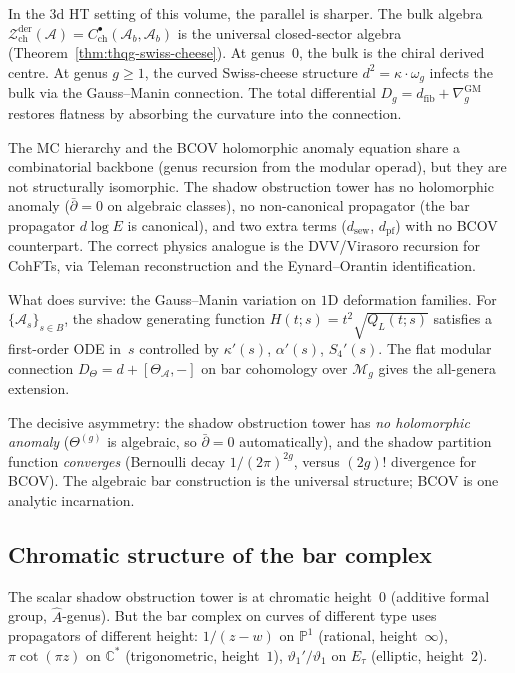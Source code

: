 \documentclass[11pt]{article}
\newcommand{\cA}{\mathcal{A}}
\newcommand{\cM}{\mathcal{M}}
\newcommand{\cZ}{\mathcal{Z}}
\newcommand{\C}{\mathbb{C}}
\newcommand{\bP}{\mathbb{P}}
\newcommand{\Zder}{\cZ^{\mathrm{der}}_{\mathrm{ch}}}
\begin{document}
In the $3$d HT setting of this volume, the parallel is sharper.
The bulk algebra $\Zder(\cA) = C^\bullet_{\mathrm{ch}}(\cA_b,
\cA_b)$ is the universal closed-sector algebra
(Theorem~\ref{thm:thqg-swiss-cheese}).  At genus~$0$, the bulk is
the chiral derived centre.  At genus $g \geq 1$, the curved
Swiss-cheese structure $d^2 = \kappa \cdot \omega_g$ infects the
bulk via the Gauss--Manin connection.  The total differential
$D_g = d_{\mathrm{fib}} + \nabla^{\mathrm{GM}}_g$ restores
flatness by absorbing the curvature into the connection.

\begin{warning}
\label{warn:bcov-not-structural-vol2}
The MC hierarchy and the BCOV holomorphic anomaly equation share a
combinatorial backbone (genus recursion from the modular operad),
but they are not structurally isomorphic.  The shadow obstruction tower has no
holomorphic anomaly ($\bar\partial = 0$ on algebraic classes), no
non-canonical propagator (the bar propagator $d\log E$ is
canonical), and two extra terms ($d_{\mathrm{sew}}$,
$d_{\mathrm{pf}}$) with no BCOV counterpart.  The correct physics
analogue is the DVV/Virasoro recursion for CohFTs, via Teleman
reconstruction and the Eynard--Orantin identification.
\end{warning}

\noindent
What does survive: the Gauss--Manin variation on $1$D deformation
families.  For $\{\cA_s\}_{s \in B}$, the shadow generating
function $H(t;s) = t^2\sqrt{Q_L(t;s)}$ satisfies a first-order
ODE in~$s$ controlled by $\kappa'(s)$, $\alpha'(s)$, $S_4'(s)$.
The flat modular connection $D_\Theta = d + [\Theta_\cA, -]$ on
bar cohomology over $\cM_g$ gives the all-genera extension.

The decisive asymmetry: the shadow obstruction tower has \emph{no holomorphic
anomaly} ($\Theta^{(g)}$ is algebraic, so $\bar\partial = 0$
automatically), and the shadow partition function \emph{converges}
(Bernoulli decay $1/(2\pi)^{2g}$, versus $(2g)!$ divergence for
BCOV).  The algebraic bar construction is the universal structure;
BCOV is one analytic incarnation.


\subsection{Chromatic structure of the bar complex}
\label{subsec:chromatic-bar}

The scalar shadow obstruction tower is at chromatic height~$0$ (additive
formal group, $\hat{A}$-genus).  But the bar complex on curves
of different type uses propagators of different height:
$1/(z{-}w)$ on $\bP^1$ (rational, height~$\infty$),
$\pi\cot(\pi z)$ on $\C^*$ (trigonometric, height~$1$),
$\vartheta_1'/\vartheta_1$ on $E_\tau$ (elliptic, height~$2$).
\end{document}
